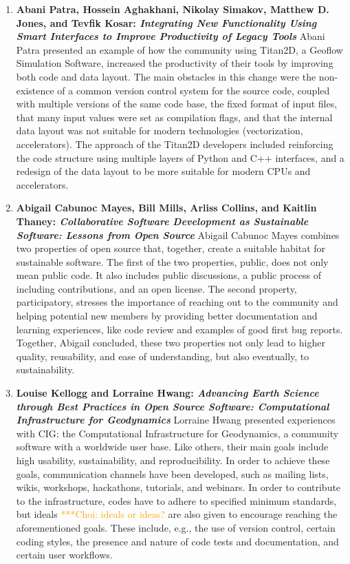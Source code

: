 \documentclass[11pt, oneside]{amsart}
\newcommand{\choinote}[1]{ {\textcolor{orange}    {***Choi: #1 }}}
\begin{document}
\begin{enumerate}
\item \textbf{Abani Patra, Hossein Aghakhani, Nikolay Simakov, Matthew D. Jones,
and Tevfik Kosar: \textit{Integrating New Functionality Using Smart Interfaces
to Improve Productivity of Legacy Tools}} Abani Patra presented an example of how
the community using Titan2D, a Geoflow Simulation Software, increased the
productivity of their tools by improving both code and data layout. The main
obstacles in this change were the non-existence of a common version control
system for the source code, coupled with multiple versions of the same code
base, the fixed format of input files, that many input values were set as
compilation flags, and that the internal data layout was not suitable for modern
technologies (vectorization, accelerators). The approach of the Titan2D
developers included reinforcing the code structure using  multiple layers of
Python and C++ interfaces, and a redesign of the data layout to be more suitable for
modern CPUs and accelerators.

\item \textbf{Abigail Cabunoc Mayes, Bill Mills, Arliss Collins, and Kaitlin
Thaney: \textit{Collaborative Software Development as Sustainable Software: Lessons
from Open Source}}
Abigail Cabunoc Mayes combines two properties of open source that, together,
create a suitable habitat for sustainable software. The first of the two
properties, public, does not only mean public code. It also includes
public discussions, a public process of including contributions, and an open
license. The second property, participatory, stresses the importance of
reaching out to the community and helping potential new members by providing
better documentation and learning experiences, like code review and examples of
good first bug reports. Together, Abigail concluded, these two properties not
only lead to higher quality, reusability, and ease of understanding, but also
eventually, to sustainability.

\item \textbf{Louise Kellogg and Lorraine Hwang: \textit{Advancing Earth Science
through Best Practices in Open Source Software: Computational Infrastructure for
Geodynamics}} Lorraine Hwang presented experiences with CIG: the Computational
Infrastructure for Geodynamics, a community software with a worldwide user base.
Like others, their main goals include high usability, sustainability, and
reproducibility. In order to achieve these goals, communication channels have been
developed, such as mailing lists, wikis, workshops, hackathons, tutorials, and
webinars. In order to contribute to the infrastructure, codes have to adhere to
specified minimum standards, but ideals \choinote{ideals or ideas?} are also given to encourage reaching the
aforementioned goals. These include, e.g., the use of version control, certain
coding styles, the presence and nature of code tests and documentation, and
certain user workflows.


\end{enumerate}
\end{document}
